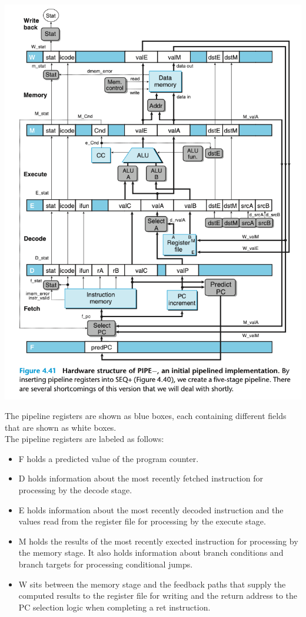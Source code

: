 \documentclass[11pt]{article}
\begin{document}
\begin{center}
\includegraphics[width=.9\linewidth]{pics/figure4.41-hardware-structure-of-pipe-.png}
\end{center}

The pipeline registers are shown as blue boxes, each containing different fields that are shown as white boxes.\\

The pipeline registers are labeled as follows:\\
\begin{itemize}
\item F holds a predicted value of the program counter.\\
\item D holds information about the most recently fetched instruction for processing by the decode stage.\\
\item E holds information about the most recently decoded instruction and the values read from the register file for processing by the execute stage.\\
\item M holds the results of the most recently exected instruction for processing by the memory stage. It also holds information about branch conditions and branch targets for processing conditional jumps.\\
\item W sits between the memory stage and the feedback paths that supply the computed results to the register file for writing and the return address to the PC selection logic when completing a ret instruction.\\
\end{itemize}
\end{document}
